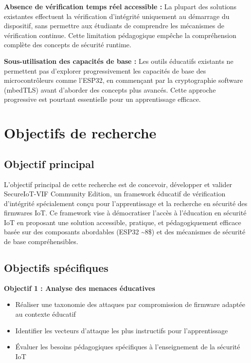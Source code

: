 \textbf{Absence de vérification temps réel accessible :} La plupart des solutions existantes effectuent la vérification d'intégrité uniquement au démarrage du dispositif, sans permettre aux étudiants de comprendre les mécanismes de vérification continue. Cette limitation pédagogique empêche la compréhension complète des concepts de sécurité runtime.

\textbf{Sous-utilisation des capacités de base :} Les outils éducatifs existants ne permettent pas d'explorer progressivement les capacités de base des microcontrôleurs comme l'ESP32, en commençant par la cryptographie software (mbedTLS) avant d'aborder des concepts plus avancés. Cette approche progressive est pourtant essentielle pour un apprentissage efficace.

\section{Objectifs de recherche}

\subsection{Objectif principal}

L'objectif principal de cette recherche est de concevoir, développer et valider SecureIoT-VIF Community Edition, un framework éducatif de vérification d'intégrité spécialement conçu pour l'apprentissage et la recherche en sécurité des firmwares IoT. Ce framework vise à démocratiser l'accès à l'éducation en sécurité IoT en proposant une solution accessible, pratique, et pédagogiquement efficace basée sur des composants abordables (ESP32 \textasciitilde 8\$) et des mécanismes de sécurité de base compréhensibles.

\subsection{Objectifs spécifiques}

\textbf{Objectif 1 : Analyse des menaces éducatives}
\begin{itemize}
    \item Réaliser une taxonomie des attaques par compromission de firmware adaptée au contexte éducatif
    \item Identifier les vecteurs d'attaque les plus instructifs pour l'apprentissage
    \item Évaluer les besoins pédagogiques spécifiques à l'enseignement de la sécurité IoT
\end{itemize}

